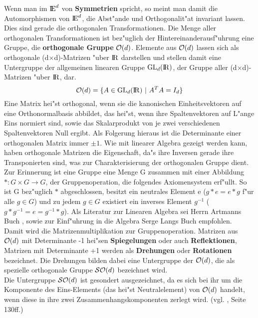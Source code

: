 Wenn man im $\mbox{$\rm I\!E$}^d$ von {\bf Symmetrien} spricht, so meint man
damit die Automorphismen von $\mbox{$\rm I\!E$}^d$, die Abst"ande und Orthogonalit"at
invariant lassen. Dies sind gerade die orthogonalen Transformationen.
Die Menge aller orthogonalen Transformationen ist bez"uglich der
Hintereinanderausf"uhrung eine Gruppe, die {\bf orthogonale Gruppe}
${\cal O}(d)$. Elemente aus ${\cal O}(d)$ lassen sich
als orthogonale (d$\times$d)-Matrizen "uber $\mbox{$\rm I\!R$}$ darstellen und stellen damit
eine Untergruppe der allgemeinen linearen Gruppe $\mbox{GL}_d(\mbox{$\rm I\!R$})$, der Gruppe
aller (d$\times$d)-Matrizen "uber $\mbox{$\rm I\!R$}$, dar.
$${\cal O}(d) = \{ A\in\mbox{GL}_d(\mbox{$\rm I\!R$})~|~A^T A = I_d\}$$
{\scsi
Eine Matrix hei"st orthogonal, wenn sie die kanonischen Einheitsvektoren auf
eine Orthonormalbasis abbildet, das hei"st, wenn ihre Spaltenvektoren
auf L"ange Eins normiert sind, sowie das Skalarprodukt von je zwei
verschiedenen Spaltenvektoren Null ergibt. Als Folgerung hieraus ist die
Determinante einer orthogonalen Matrix immer $\pm 1$. Wie mit linearer Algebra
gezeigt werden kann, haben orthogonale Matrizen die Eigenschaft, da"s ihre
Inversen gerade ihre Transponierten sind, was zur Charakterisierung
der orthogonalen Gruppe dient.\\
Zur Erinnerung ist eine Gruppe eine Menge G zusammen mit einer Abbildung
$*:G\times G\to G$, der Gruppenoperation, die folgendes Axiomensystem erf"ullt.
So ist G bez"uglich $*$ abgeschlossen, besitzt ein neutrales Element e
($g*e=e*g$ f"ur alle $g\in G$) und zu jedem $g\in G$ existiert ein inverses
Element $g^{-1}$ ($g*g^{-1}=e=g^{-1}*g$). Als Literatur zur Linearen Algebra
sei Herrn Artmanns Buch \cite{Art:89}, sowie zur Einf"uhrung in die
Algebra Serge Langs Buch \cite{La:79} empfohlen.
}\\
Damit wird die Matrizenmultiplikation zur Gruppenoperation.
Matrizen aus ${\cal O}(d)$ mit Determinante -1 hei"sen {\bf Spiegelungen} oder
auch {\bf Reflektionen}, Matrizen mit
Determinante +1 werden als {\bf Drehungen} oder {\bf Rotationen}
 bezeichnet. Die Drehungen bilden dabei eine Untergruppe der
${\cal O}(d)$, die als spezielle orthogonale Gruppe ${\cal SO}(d)$ bezeichnet
wird.\\
{\scsi
Die Untergruppe ${\cal SO}(d)$ ist gesondert ausgezeichnet, da es sich bei
ihr um die Komponente des Eins-Elements (das hei"st Neutralelement) von
${\cal O}(d)$ handelt, wenn diese in ihre zwei Zusammenhangskomponenten
zerlegt wird. (vgl. \cite{Os:92}, Seite 130ff.)}

